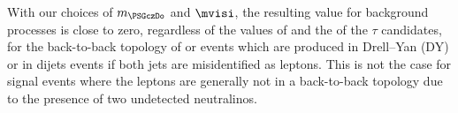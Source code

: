 With  our choices of $m_{\PSGczDo}$ and $\mvisi$, the resulting \mttwo value for background processes is close to zero, regardless of the values of \MPT and the \PT of 
the $\tau$ candidates, for the 
back-to-back topology of \tauTau or \leptonTau  
events which are produced in Drell--Yan (DY) or in dijets events if both jets are misidentified as leptons. This is not the case for signal events where the leptons are generally not in a back-to-back topology due 
to the presence of two undetected neutralinos.

